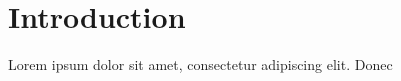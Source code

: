 \documentclass[12pt]{article}
\begin{document}
\section{Introduction}
Lorem ipsum dolor sit amet, consectetur adipiscing elit. Donec
\end{document}
